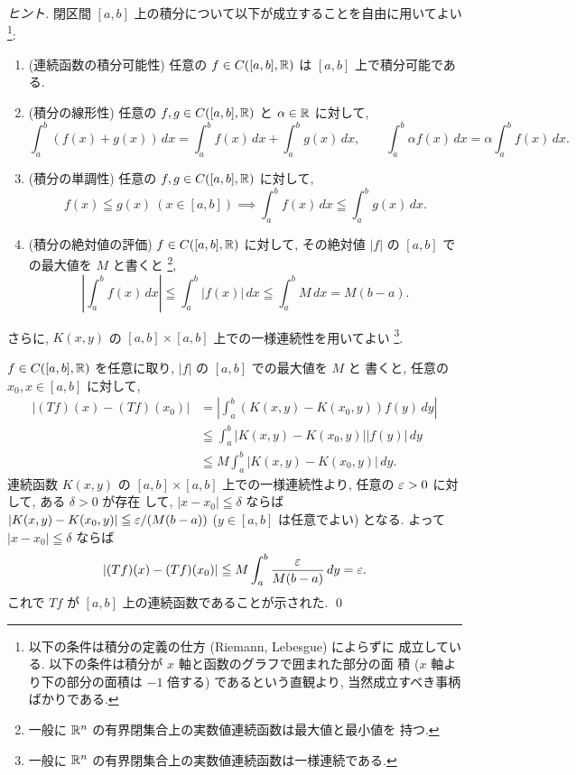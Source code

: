 \documentclass[12pt,twoside]{jarticle}
\begin{document}
\begin{proof}[ヒント]
  閉区間 $[a,b]$ 上の積分について以下が成立することを自由に用いてよい%
  \footnote{以下の条件は積分の定義の仕方 (Riemann, Lebesgue) によらずに
    成立している.  以下の条件は積分が $x$ 軸と函数のグラフで囲まれた部分の面
    積 ($x$ 軸より下の部分の面積は $-1$ 倍する) であるという直観より, 
    当然成立すべき事柄ばかりである.}:
  \begin{enumerate}
  \item (連続函数の積分可能性) \quad 
    任意の $f\in C([a,b],{\mathbb R})$ は $[a,b]$ 上で積分可能である.
  \item (積分の線形性) \quad
    任意の $f,g\in C([a,b],{\mathbb R})$ と $\alpha\in{\mathbb R}$ に対して,
    \begin{equation*}
      \int_a^b (f(x)+g(x))\,dx = \int_a^b f(x)\,dx + \int_a^b g(x)\,dx,
      \qquad
      \int_a^b \alpha f(x)\,dx = \alpha \int_a^b f(x)\,dx.
    \end{equation*}
  \item (積分の単調性) \quad
    任意の $f,g\in C([a,b],{\mathbb R})$ に対して, 
    \begin{equation*}
      f(x)\leqq g(x) \ (x\in[a,b]) 
      \implies
      \int_a^b f(x)\,dx \leqq \int_a^b g(x)\,dx.
    \end{equation*}
  \item (積分の絶対値の評価) \quad
    $f\in C([a,b],{\mathbb R})$ に対して, 
    その絶対値 $|f|$ の $[a,b]$ での最大値を $M$ と書くと%
    \footnote{一般に ${\mathbb R}^n$ の有界閉集合上の実数値連続函数は最大値と最小値を
      持つ.}, 
    \begin{equation*}
      \left|\int_a^b f(x)\,dx\right| 
      \leqq \int_a^b|f(x)|\,dx
      \leqq \int_a^b M\,dx = M(b-a).
    \end{equation*}
  \end{enumerate}
  さらに, $K(x,y)$ の $[a,b]\times [a,b]$ 上での一様連続性を用いてよい%
  \footnote{一般に ${\mathbb R}^n$ の有界閉集合上の実数値連続函数は一様連続である.}.

  $f\in C([a,b],{\mathbb R})$ を任意に取り, $|f|$ の $[a,b]$ での最大値を $M$ と
  書くと, 任意の $x_0,x\in [a,b]$ に対して,
  \begin{align*}
    |(Tf)(x) - (Tf)(x_0)| 
    &
    = \left|\int_a^b (K(x,y) - K(x_0,y))f(y)\,dy \right|
    \\  &
    \leqq \int_a^b |K(x,y)-K(x_0,y)||f(y)|\,dy
    \\ &
    \leqq M \int_a^b |K(x,y)-K(x_0,y)|\, dy.
  \end{align*}
  連続函数 $K(x,y)$ の $[a,b]\times[a,b]$ 上での一様連続性より, 
  任意の $\varepsilon>0$ に対して, ある $\delta > 0$ が存在
  して,  $|x-x_0|\leqq\delta$ ならば $|K(x,y)-K(x_0,y)|\leqq\varepsilon/(M(b-a))$ 
  ($y\in [a,b]$ は任意でよい) となる.
  よって $|x-x_0|\leqq\delta$ ならば
  \begin{equation*}
    |(Tf)(x) - (Tf)(x_0)| \leqq M \int_a^b \frac{\varepsilon}{M(b-a)}\,dy = \varepsilon.
  \end{equation*}
  これで $Tf$ が $[a,b]$ 上の連続函数であることが示された.
  \qed
\end{proof}
\end{document}
